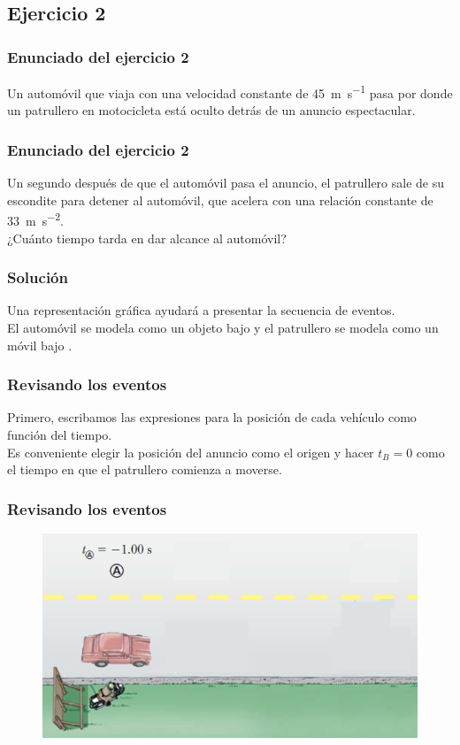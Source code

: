 \documentclass[14pt]{beamer}
\begin{document}
\subsection{Ejercicio 2}

\begin{frame}
\frametitle{Enunciado del ejercicio 2}
Un automóvil que viaja con una velocidad constante de \SI{45}{\meter\per\second} pasa por donde un patrullero en motocicleta está oculto
detrás de un anuncio espectacular.
\end{frame}
\begin{frame}
\frametitle{Enunciado del ejercicio 2}
Un segundo después de que el automóvil pasa el anuncio, el patrullero sale de su escondite para detener al automóvil, que acelera con una
relación constante de \SI{33}{\meter\per\square\second}.
\\
\bigskip
\pause
¿Cuánto tiempo tarda en dar alcance al automóvil?
\end{frame}
\begin{frame}
\frametitle{Solución}
Una representación gráfica ayudará a presentar
la secuencia de eventos.
\\
\bigskip
\pause
El automóvil se modela como un objeto bajo  y el patrullero se modela como un móvil bajo .
\end{frame}
\begin{frame}
\frametitle{Revisando los eventos}
Primero, escribamos las expresiones para la posición de cada vehículo como función del tiempo.
\\
\bigskip
\pause
Es conveniente elegir la posición del anuncio como el origen y hacer $t_{B} = 0$ como el
tiempo en que el patrullero comienza a moverse. 
\end{frame}
\begin{frame}
\frametitle{Revisando los eventos}
\begin{figure}
    \centering
    \includegraphics[scale=0.8]{Imagenes/Ejercicio_MUA_02_01.png}
\end{figure}
\end{frame}
\end{document}
